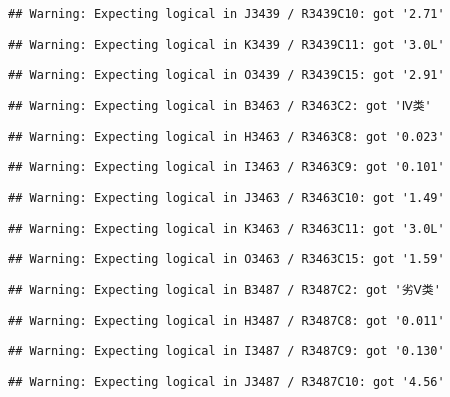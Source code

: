 \documentclass[
]{article}
\begin{document}
\begin{verbatim}
## Warning: Expecting logical in J3439 / R3439C10: got '2.71'
\end{verbatim}

\begin{verbatim}
## Warning: Expecting logical in K3439 / R3439C11: got '3.0L'
\end{verbatim}

\begin{verbatim}
## Warning: Expecting logical in O3439 / R3439C15: got '2.91'
\end{verbatim}

\begin{verbatim}
## Warning: Expecting logical in B3463 / R3463C2: got 'Ⅳ类'
\end{verbatim}

\begin{verbatim}
## Warning: Expecting logical in H3463 / R3463C8: got '0.023'
\end{verbatim}

\begin{verbatim}
## Warning: Expecting logical in I3463 / R3463C9: got '0.101'
\end{verbatim}

\begin{verbatim}
## Warning: Expecting logical in J3463 / R3463C10: got '1.49'
\end{verbatim}

\begin{verbatim}
## Warning: Expecting logical in K3463 / R3463C11: got '3.0L'
\end{verbatim}

\begin{verbatim}
## Warning: Expecting logical in O3463 / R3463C15: got '1.59'
\end{verbatim}

\begin{verbatim}
## Warning: Expecting logical in B3487 / R3487C2: got '劣Ⅴ类'
\end{verbatim}

\begin{verbatim}
## Warning: Expecting logical in H3487 / R3487C8: got '0.011'
\end{verbatim}

\begin{verbatim}
## Warning: Expecting logical in I3487 / R3487C9: got '0.130'
\end{verbatim}

\begin{verbatim}
## Warning: Expecting logical in J3487 / R3487C10: got '4.56'
\end{verbatim}
\end{document}
